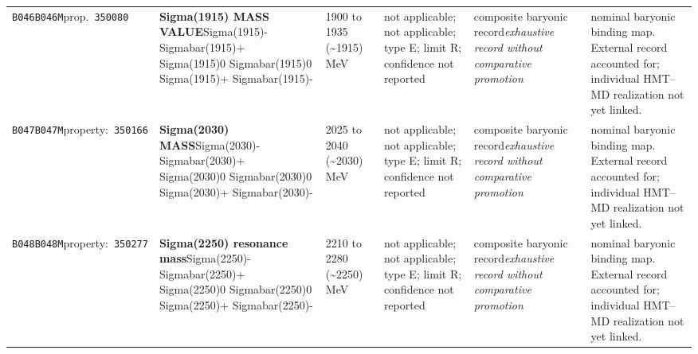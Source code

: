 \begin{landscape}
\begin{longtable}{L{1.85cm}L{4.45cm}L{2.35cm}L{4.05cm}L{3.35cm}L{7.15cm}}
\texttt{B046}\newline \texttt{B046M}\newline prop.\ \texttt{350080} & \textbf{Sigma(1915) MASS VALUE}\newline Sigma(1915)- \textbar{}\allowbreak{} Sigmabar(1915)+ \textbar{}\allowbreak{} Sigma(1915)0 \textbar{}\allowbreak{} Sigmabar(1915)0 \textbar{}\allowbreak{} Sigma(1915)+ \textbar{}\allowbreak{} Sigmabar(1915)- & 1900 to 1935 (\textasciitilde{}1915)\,MeV & not applicable; not applicable; type E; limit R; confidence not reported & composite baryonic record\newline \emph{exhaustive record without comparative promotion} & nominal baryonic binding map. External record accounted for; individual HMT--MD realization not yet linked. \\
\texttt{B047}\newline \texttt{B047M}\newline property:\ \texttt{350166} & \textbf{Sigma(2030) MASS}\newline Sigma(2030)- \textbar{}\allowbreak{} Sigmabar(2030)+ \textbar{}\allowbreak{} Sigma(2030)0 \textbar{}\allowbreak{} Sigmabar(2030)0 \textbar{}\allowbreak{} Sigma(2030)+ \textbar{}\allowbreak{} Sigmabar(2030)- & 2025 to 2040 (\textasciitilde{}2030)\,MeV & not applicable; not applicable; type E; limit R; confidence not reported & composite baryonic record\newline \emph{exhaustive record without comparative promotion} & nominal baryonic binding map. External record accounted for; individual HMT--MD realization not yet linked. \\
\texttt{B048}\newline \texttt{B048M}\newline property:\ \texttt{350277} & \textbf{Sigma(2250) resonance mass}\newline Sigma(2250)- \textbar{}\allowbreak{} Sigmabar(2250)+ \textbar{}\allowbreak{} Sigma(2250)0 \textbar{}\allowbreak{} Sigmabar(2250)0 \textbar{}\allowbreak{} Sigma(2250)+ \textbar{}\allowbreak{} Sigmabar(2250)- & 2210 to 2280 (\textasciitilde{}2250)\,MeV & not applicable; not applicable; type E; limit R; confidence not reported & composite baryonic record\newline \emph{exhaustive record without comparative promotion} & nominal baryonic binding map. External record accounted for; individual HMT--MD realization not yet linked. \\

\end{longtable}
\end{landscape}
